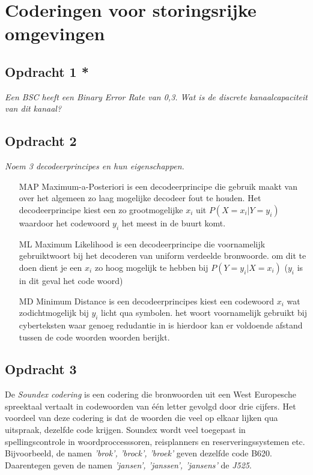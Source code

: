 \chapter{Coderingen voor storingsrijke omgevingen}

\section{Opdracht 1 *}
\emph{Een BSC heeft een \emph{Binary Error Rate} van 0,3. Wat is de discrete kanaalcapaciteit van dit kanaal?}

\section{Opdracht 2}
\emph{Noem 3 decodeerprincipes en hun eigenschappen.}\\

\begin{itemize}
\item[MAP] Maximum-a-Posteriori is een decodeerprincipe die gebruik maakt van over het algemeen zo laag mogelijke decodeer fout te houden. Het decodeerprincipe kiest een zo grootmogelijke $x_i$ uit $P(X=x_i|Y=y_i)$ waardoor het codewoord $y_i$ het meest in de buurt komt.
\item[ML] Maximum Likelihood is een decodeerprincipe die voornamelijk gebruiktwoort bij het decoderen van uniform verdeelde bronwoorde. om dit te doen dient je een $x_i$ zo hoog mogelijk te hebben bij $P(Y=y_i|X=x_i)$ ($y_i$ is in dit geval het code woord)
\item[MD] Minimum Distance is een decodeerprincipes kiest een codewoord $x_i$ wat zodichtmogelijk bij $y_i$ licht qua symbolen. het  woort voornamelijk gebruikt bij cyberteksten waar genoeg redudantie in is hierdoor kan er voldoende afstand tussen de code woorden woorden berijkt.
\end{itemize}

\section{Opdracht 3}
De \emph{Soundex codering} is een codering die bronwoorden uit een West Europesche spreektaal vertaalt in codewoorden van \'{e}\'{e}n letter gevolgd door drie cijfers. Het voordeel van deze codering is dat de woorden die veel op elkaar lijken qua uitspraak, dezelfde code krijgen. Soundex wordt veel toegepast in spellingscontrole in woordproccesssoren, reisplanners en reserveringssystemen etc. Bijvoorbeeld, de namen \emph{'brok', 'brock', 'broek'} geven dezelfde code B620. Daarentegen geven de namen \emph{'jansen', 'janssen', 'jansens'} de \emph{J525}.

